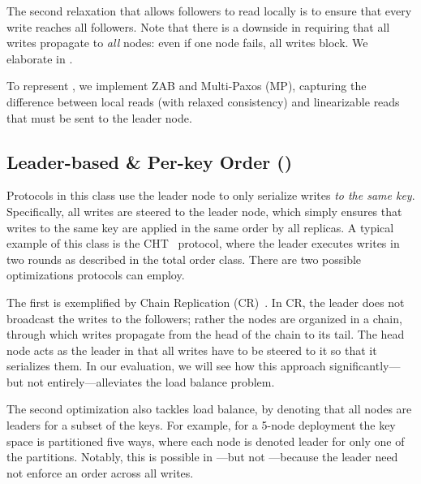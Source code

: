 The second relaxation that allows followers to read locally is to 
ensure that every write reaches all followers. 
Note that there is a downside in requiring that all writes propagate to \emph{all} nodes: even if one node fails, all writes block. We elaborate in .

To represent \LTO, we implement ZAB and Multi-Paxos (MP), capturing the difference between local reads (with relaxed consistency) and linearizable reads that must be sent to the leader node.


\subsection{Leader-based \& Per-key Order (\LPKO)}\label{sec:tax:lpko}

Protocols in this class use the leader node to only serialize writes \emph{to the same key}. Specifically, all writes are steered to the leader node, which simply ensures that writes to the same key are applied in the same order by all replicas. A typical example of this class is the CHT~\cite{Chandra:2016} protocol, where the leader executes writes in two rounds as described in the total order class. 
There are two possible optimizations protocols can employ.

The first is exemplified by Chain Replication (CR)~\cite{VanRenesse:2004}. In CR, the leader does not broadcast the writes to the followers; rather the nodes are organized in a chain, through which writes propagate from the head of the chain to its tail. The head node acts as the leader in that all writes have to be steered to it so that it serializes them. In our evaluation, we will see how this approach significantly---but not entirely---alleviates the load balance problem.

The second optimization also tackles load balance, by denoting that all nodes are leaders for a subset of the keys. For example, for a 5-node deployment the key space is partitioned five ways, where each node is denoted leader for only one of the partitions.
Notably, this is possible in \LPKO---but not \LTO---because the leader need not enforce an order across all writes. %

